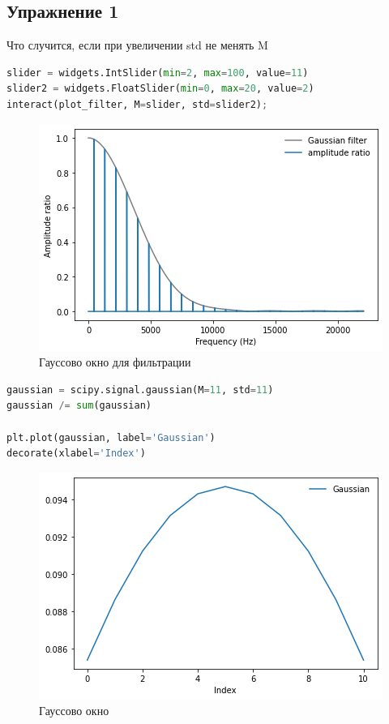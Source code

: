\subsection{Упражнение 1}

Что случится, если при увеличении std не менять M

\begin{lstlisting}[language=Python]
slider = widgets.IntSlider(min=2, max=100, value=11)
slider2 = widgets.FloatSlider(min=0, max=20, value=2)
interact(plot_filter, M=slider, std=slider2);
\end{lstlisting}

\begin{figure}[H]
	\begin{center}
		\includegraphics[scale=1]{fig/lab08/lab08_1.png}
		\caption{Гауссово окно для фильтрации}
	\end{center}
\end{figure}

\begin{lstlisting}[language=Python]
gaussian = scipy.signal.gaussian(M=11, std=11)
gaussian /= sum(gaussian)

plt.plot(gaussian, label='Gaussian')
decorate(xlabel='Index')
\end{lstlisting}
\begin{figure}[H]
	\begin{center}
		\includegraphics[scale=0.7]{fig/lab08/lab08_2.png}
		\caption{Гауссово окно}
	\end{center}
\end{figure}


